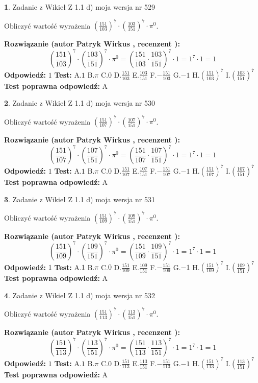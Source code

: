 \documentclass[12pt, a4paper]{article}
\theoremstyle{definition} %
\newtheorem{zad}{}
\newcommand{\zadStart}[1]{\begin{zad}#1\newline}
\newcommand{\zadStop}{\end{zad}}
\newcommand{\rozwStart}[2]{\noindent \textbf{Rozwiązanie (autor #1 , recenzent #2): }\newline}
\newcommand{\rozwStop}{\newline}
\newcommand{\odpStart}{\noindent \textbf{Odpowiedź:}\newline}
\newcommand{\odpStop}{\newline}
\newcommand{\testStart}{\noindent \textbf{Test:}\newline}
\newcommand{\testStop}{\newline}
\newcommand{\kluczStart}{\noindent \textbf{Test poprawna odpowiedź:}\newline}
\newcommand{\kluczStop}{\newline}
\begin{document}
\zadStart{Zadanie z Wikieł Z 1.1 d) moja wersja nr 529}

Obliczyć wartość wyrażenia $(\frac{151}{103})^{7} \cdot (\frac{103}{151})^{7} \cdot \pi^{0}$.
\zadStop
\rozwStart{Patryk Wirkus}{}
$$(\frac{151}{103})^{7} \cdot (\frac{103}{151})^{7} \cdot \pi^{0} = (\frac{151}{103} \cdot \frac{103}{151})^{7} \cdot 1 = 1^{7} \cdot 1 = 1$$
\rozwStop
\odpStart
$1$
\odpStop
\testStart
A.$1$ B.$\pi$ C.$0$ D.$\frac{151}{103}$ E.$\frac{103}{151}$
F.$-\frac{151}{103}$ G.$-1$
H.$(\frac{151}{103})^{7}$
I.$(\frac{103}{151})^{7}$
\testStop
\kluczStart
A
\kluczStop



\zadStart{Zadanie z Wikieł Z 1.1 d) moja wersja nr 530}

Obliczyć wartość wyrażenia $(\frac{151}{107})^{7} \cdot (\frac{107}{151})^{7} \cdot \pi^{0}$.
\zadStop
\rozwStart{Patryk Wirkus}{}
$$(\frac{151}{107})^{7} \cdot (\frac{107}{151})^{7} \cdot \pi^{0} = (\frac{151}{107} \cdot \frac{107}{151})^{7} \cdot 1 = 1^{7} \cdot 1 = 1$$
\rozwStop
\odpStart
$1$
\odpStop
\testStart
A.$1$ B.$\pi$ C.$0$ D.$\frac{151}{107}$ E.$\frac{107}{151}$
F.$-\frac{151}{107}$ G.$-1$
H.$(\frac{151}{107})^{7}$
I.$(\frac{107}{151})^{7}$
\testStop
\kluczStart
A
\kluczStop



\zadStart{Zadanie z Wikieł Z 1.1 d) moja wersja nr 531}

Obliczyć wartość wyrażenia $(\frac{151}{109})^{7} \cdot (\frac{109}{151})^{7} \cdot \pi^{0}$.
\zadStop
\rozwStart{Patryk Wirkus}{}
$$(\frac{151}{109})^{7} \cdot (\frac{109}{151})^{7} \cdot \pi^{0} = (\frac{151}{109} \cdot \frac{109}{151})^{7} \cdot 1 = 1^{7} \cdot 1 = 1$$
\rozwStop
\odpStart
$1$
\odpStop
\testStart
A.$1$ B.$\pi$ C.$0$ D.$\frac{151}{109}$ E.$\frac{109}{151}$
F.$-\frac{151}{109}$ G.$-1$
H.$(\frac{151}{109})^{7}$
I.$(\frac{109}{151})^{7}$
\testStop
\kluczStart
A
\kluczStop



\zadStart{Zadanie z Wikieł Z 1.1 d) moja wersja nr 532}

Obliczyć wartość wyrażenia $(\frac{151}{113})^{7} \cdot (\frac{113}{151})^{7} \cdot \pi^{0}$.
\zadStop
\rozwStart{Patryk Wirkus}{}
$$(\frac{151}{113})^{7} \cdot (\frac{113}{151})^{7} \cdot \pi^{0} = (\frac{151}{113} \cdot \frac{113}{151})^{7} \cdot 1 = 1^{7} \cdot 1 = 1$$
\rozwStop
\odpStart
$1$
\odpStop
\testStart
A.$1$ B.$\pi$ C.$0$ D.$\frac{151}{113}$ E.$\frac{113}{151}$
F.$-\frac{151}{113}$ G.$-1$
H.$(\frac{151}{113})^{7}$
I.$(\frac{113}{151})^{7}$
\testStop
\kluczStart
A
\kluczStop
\end{document}

